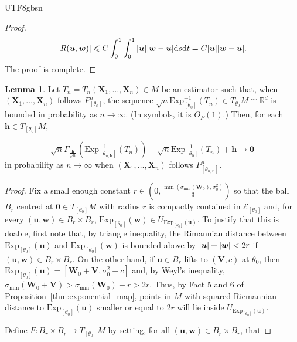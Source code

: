 \documentclass[12pt]{report}
\newcommand{\bracket}[1]{\left ( #1 \right )}
\newcommand{\squared}[1]{\left [ #1 \right ]}
\theoremstyle{plain}
\theoremstyle{definition}
\newtheorem{lemma}[theorem]{Lemma}
\begin{document}
\begin{CJK*}{UTF8}{gbsn}
\begin{proof}
\begin{equation*}
  \abs{R(\bm{u}, \bm{w})} \leqslant C \int_0^1 \int_0^1 \abs{\bm{u}}\abs{\bm{w}-\bm{u}}  \mathrm{d} s \mathrm{d} t
  = C \abs{\bm{u}}\abs{\bm{w}-\bm{u}}.
\end{equation*}
The proof is complete.
\end{proof}

\begin{lemma}\label{thm:perturbed_lemma}
Let $T_n = T_n(\bm{X}_1, \ldots, \bm{X}_n) \in M$ be an estimator 
such that, when $(\bm{X}_1, \ldots, \bm{X}_n)$ follows $P^n_{[\theta_0]}$,
the sequence
$\sqrt{n}\text{Exp}_{[\theta_0]}^{-1}(T_n) \in T_{\theta_0}M \cong \mathbb{R}^d$ is 
bounded in probability as $n \to \infty$.
(In symbols, it is $O_P(1)$.)
Then, for each $\bm{h} \in T_{[\theta_0]}M$,

\begin{equation*}
  \sqrt{n} \Gamma_{\frac{\bm{h}}{\sqrt{n}}}
  \bracket{\text{Exp}^{-1}_{\squared{\theta_{n,\bm{h}}}}(T_n)}
  - \sqrt{n} \text{Exp}_{[\theta_0]}^{-1}(T_n) 
  + \bm{h}  \to \bm{0}
\end{equation*}
in probability as $n \to \infty$ 
when $(\bm{X}_1, \ldots, \bm{X}_n)$ follows $P^n_{\squared{\theta_{n,\bm{h}}}}$.
\end{lemma}

\begin{proof}
Fix a small enough constant 
$r \in \bracket{0, \frac{\min(\sigma_{\min}(\bm{W}_0), \sigma_0^2)}{3}}$
so that the ball $B_r$ centred at $\bm{0} \in T_{[\theta_0]}M$
with radius $r$ is compactly contained in $\mathcal{E}_{[\theta_0]}$
and, for every $(\bm{u}, \bm{w}) \in B_r \times B_r$,
$\text{Exp}_{[\theta_0]}(\bm{w}) \in 
U_{\text{Exp}_{[\theta_0]}(\bm{u})}$.
To justify that this is doable, 
first note that,
by triangle inequality,
the Rimannian distance between 
$\text{Exp}_{[\theta_0]}(\bm{u})$ and 
$\text{Exp}_{[\theta_0]}(\bm{w})$ is bounded 
above by $\abs{\bm{u}} + \abs{\bm{w}} < 2r$
if $(\bm{u}, \bm{w}) \in B_r \times B_r$.
On the other hand, 
if $\bm{u} \in B_r$ lifts to $(\bm{V},c)$ 
at $\theta_0$,
then $\text{Exp}_{[\theta_0]}(\bm{u})
= [\bm{W}_0 + \bm{V}, \sigma_0^2 + c]$
and, by Weyl's inequality, 
$\sigma_{\min}(\bm{W}_0 + \bm{V}) > \sigma_{\min}(\bm{W}_0) - r > 2r$.
Thus, by Fact 5 and 6 of Proposition~\ref{thm:exponential_map},
points in $M$ with squared Riemannian distance 
to $\text{Exp}_{[\theta_0]}(\bm{u})$
smaller or equal to $2r$
will lie inside
$U_{\text{Exp}_{[\theta_0]}(\bm{u})}$.

Define $F : B_r \times B_r \to T_{[\theta_0]}M$ by setting,
for all $(\bm{u}, \bm{w}) \in B_r \times B_r$,
that 


\end{proof}
\end{CJK*}
\end{document}
